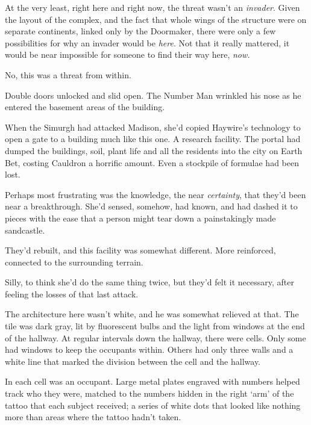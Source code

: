 At the very least, right here and right now, the threat wasn't an \emph{invader}.  Given the layout of the complex, and the fact that whole wings of the structure were on separate continents, linked only by the Doormaker, there were only a few possibilities for why an invader would be \emph{here}.  Not that it really mattered, it would be near impossible for someone to find their way here, \emph{now.}



No, this was a threat from within.



Double doors unlocked and slid open.  The Number Man wrinkled his nose as he entered the basement areas of the building.



When the Simurgh had attacked Madison, she'd copied Haywire's technology to open a gate to a building much like this one.  A research facility.  The portal had dumped the buildings, soil, plant life and all the residents into the city on Earth Bet, costing Cauldron a horrific amount.  Even a stockpile of formulae had been lost.



Perhaps most frustrating was the knowledge, the near \emph{certainty}, that they'd been near a breakthrough.  She'd sensed, somehow, had known, and had dashed it to pieces with the ease that a person might tear down a painstakingly made sandcastle.



They'd rebuilt, and this facility was somewhat different.  More reinforced, connected to the surrounding terrain.



Silly, to think she'd do the same thing twice, but they'd felt it necessary, after feeling the losses of that last attack.



The architecture here wasn't white, and he was somewhat relieved at that.  The tile was dark gray, lit by fluorescent bulbs and the light from windows at the end of the hallway.  At regular intervals down the hallway, there were cells.  Only some had windows to keep the occupants within.  Others had only three walls and a white line that marked the division between the cell and the hallway.



In each cell was an occupant.  Large metal plates engraved with numbers helped track who they were, matched to the numbers hidden in the right `arm' of the tattoo that each subject received; a series of white dots that looked like nothing more than areas where the tattoo hadn't taken.



